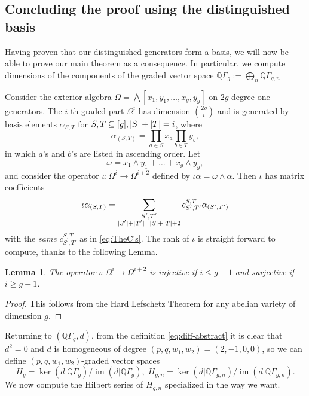 \documentclass[11pt,reqno]{amsproc}
\numberwithin{equation}{section}
\newtheorem{lemma}[theorem]{Lemma}
\theoremstyle{definition}
\theoremstyle{remark}
\newcommand\Q{{\mathbb Q}}
\DeclareMathOperator{\im}{im}
\newcommand\subeq{\subseteq}
\DeclarePairedDelimiter{\abs}{\lvert}{\rvert}
\begin{document}
\subsection{Concluding the proof using the distinguished basis}\label{sec:mainProof}

Having proven that our distinguished generators form a basis, we will now be able to prove our main theorem as a consequence. In particular, we compute dimensions of the components of the graded vector space $\Q\Gamma_g := \bigoplus_n \Q\Gamma_{g,n}$

Consider the exterior algebra $\Omega=\bigwedge[x_1,y_1,\dots,x_g,y_g]$ on $2g$ degree-one generators. The $i$-th graded part $\Omega^i$ has dimension $\binom{2g}{i}$ and is generated by basis elements $\alpha_{S,T}$ for $S,T\subeq [g], \abs{S}+\abs{T}=i$, where
\begin{equation}
    \alpha_{(S,T)}=\prod_{a\in S} x_a \prod_{b\in T} y_b,
\end{equation}
in which $a$'s and $b$'s are listed in ascending order. Let
\begin{equation}
    \omega=x_1\wedge y_1+\dots+x_g\wedge y_g,
\end{equation}
and consider the operator $\iota:\Omega^i\to \Omega^{i+2}$ defined by $\iota\alpha=\omega\wedge \alpha$. Then $\iota$ has matrix coefficients
\begin{equation}
    \iota\alpha_{(S,T)}=\sum_{\substack{S',T'\\\abs{S'}+\abs{T'}=\abs{S}+\abs{T}+2}} c^{S,T}_{S',T'} \alpha_{(S',T')}
\end{equation}
with the \emph{same} $c^{S,T}_{S',T'}$ as in \eqref{eq:TheC's}. The rank of $\iota$ is straight forward to compute, thanks to the following Lemma.

\begin{lemma}
    The operator $\iota:\Omega^i\to \Omega^{i+2}$ is injective if $i\leq g-1$ and surjective if $i\geq g-1$. 
    \label{lem:hard-lefschetz}
\end{lemma}
\begin{proof}
    This follows from the Hard Lefschetz Theorem for any abelian variety of dimension $g$.
\end{proof}

Returning to $(\Q\Gamma_g,d)$, from the definition \eqref{eq:diff-abstract} it is clear that $d^2=0$ and $d$ is homogeneous of degree $(p,q,w_1,w_2)=(2,-1,0,0)$, so we can define $(p,q,w_1,w_2)$-graded vector spaces
\begin{equation}\label{eq:hgn}
    H_g=\ker(d|\Q\Gamma_g)/\im(d|\Q\Gamma_g),\; H_{g,n}=\ker(d|\Q\Gamma_{g,n})/\im(d|\Q\Gamma_{g,n}).
\end{equation}
We now compute the Hilbert series of $H_{g,n}$ specialized in the way we want.
\end{document}
